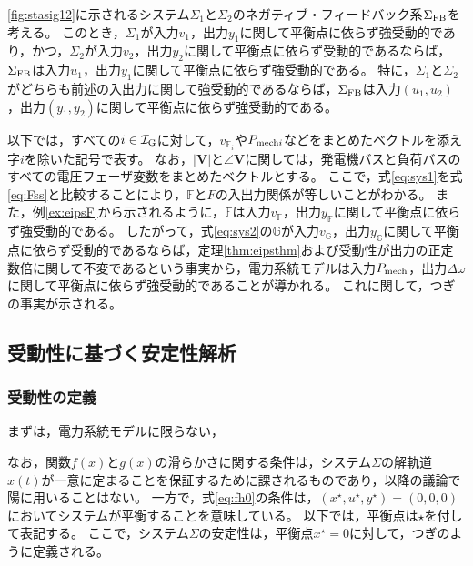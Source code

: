 \documentclass[tombow,dvipdfmx]{corona-a5}
\begin{document}
\begin{定理}[平衡点に依らない受動性に関する受動定理]\label{thm:eipsthm}
\ref{fig:stasig12}に示されるシステム$\Sigma_1$と$\Sigma_2$のネガティブ・フィードバック系$\Sigma_{\rm FB}$を考える。
このとき，$\Sigma_1$が入力$v_1$，出力$y_1$に関して平衡点に依らず強受動的であり，かつ，$\Sigma_2$が入力$v_2$，出力$y_2$に関して平衡点に依らず受動的であるならば，$\Sigma_{\rm FB}$は入力$u_1$，出力$y_1$に関して平衡点に依らず強受動的である。
特に，$\Sigma_1$と$\Sigma_2$がどちらも前述の入出力に関して強受動的であるならば，$\Sigma_{\rm FB}$は入力$(u_1,u_2)$，出力$(y_1,y_2)$に関して平衡点に依らず強受動的である。
\end{定理}





以下では，すべての$i \in \mathcal{I}_{\rm G}$に対して，$v_{{\mathds F}_i}$や$P_{{\rm mech}i}$などをまとめたベクトルを添え字$i$を除いた記号で表す。
なお，$|\bm{V}|$と$\angle \bm{V}$に関しては，発電機バスと負荷バスのすべての電圧フェーザ変数をまとめたベクトルとする。
ここで，式\ref{eq:sys1}を式\ref{eq:Fss}と比較することにより，$\mathds{F}$と$F$の入出力関係が等しいことがわかる。
また，例\ref{ex:eipsF}から示されるように，$\mathds{F}$は入力$v_{\mathds F}$，出力$y_{\mathds F}$に関して平衡点に依らず強受動的である。
したがって，式\ref{eq:sys2}の$\mathds{G}$が入力$v_{\mathds G}$，出力$y_{\mathds G}$に関して平衡点に依らず受動的であるならば，定理\ref{thm:eipsthm}および受動性が出力の正定数倍に関して不変であるという事実から，電力系統モデルは入力$P_{\rm mech}$，出力$\Delta \omega$に関して平衡点に依らず強受動的であることが導かれる。
これに関して，つぎの事実が示される。






\subsection{受動性に基づく安定性解析\advanced}\label{sec:passstab}

\subsubsection{受動性の定義}

まずは，電力系統モデルに限らない，



なお，関数$f(x)$と$g(x)$の滑らかさに関する条件は，システム$\Sigma$の解軌道$x(t)$が一意に定まることを保証するために課されるものであり，以降の議論で陽に用いることはない。
一方で，式\ref{eq:fh0}の条件は，$(x^{\star},u^{\star},y^{\star})=(0,0,0)$においてシステムが平衡することを意味している。
以下では，平衡点は$\star$を付して表記する。
ここで，システム$\Sigma$の安定性は，平衡点$x^{\star}=0$に対して，つぎのように定義される。
\end{document}
